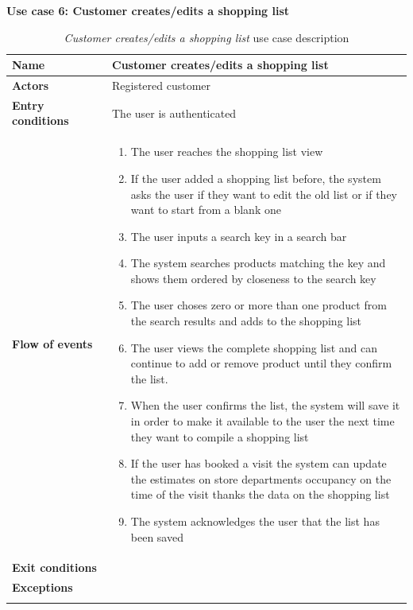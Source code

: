 \clearpage
\textbf{Use case 6: Customer creates/edits a shopping list}
\smallskip
{}
\begin{longtable}{p{0.25\linewidth}p{0.75\linewidth}}
    \toprule
    \textbf{Name}             & \textbf{Customer creates/edits a shopping list} \\
    \midrule
    \textbf{Actors}           & Registered customer                             \\
    \midrule
    \textbf{Entry conditions} & The user is authenticated                       \\
    \midrule
    \textbf{Flow of events}   &
    \begin{enumerate}
        \item The user reaches the shopping list view
        \item If the user added a shopping list before, the system asks the user if they want to edit the old list or if they want to start from a blank one
        \item The user inputs a search key in a search bar
        \item The system searches products matching the key and shows them ordered by closeness to the search key
        \item The user choses zero or more than one product from the search results and adds to the shopping list
        \item The user views the complete shopping list and can continue to add or remove product until they confirm the list.
        \item When the user confirms the list, the system will save it in order to make it available to the user the next time they want to compile a shopping list
        \item If the user has booked a visit the system can update the estimates on store departments occupancy on the time of the visit thanks the data on the shopping list
        \item The system acknowledges the user that the list has been saved
    \end{enumerate}                                                  \\
    \midrule
    \textbf{Exit conditions}  &                                                 \\
    \midrule
    \textbf{Exceptions}       &                                                 \\
    \bottomrule
    \caption{\emph{Customer creates/edits a shopping list} use case description}
\end{longtable}

